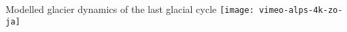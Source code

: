 \documentclass[aspectratio=1610]{beamer}
\begin{document}
%
%

    \begin{frame}{Modelled glacier dynamics of the last glacial cycle}
      \texttt{[image: vimeo-alps-4k-zo-ja]}\\
    \end{frame}
\end{document}
